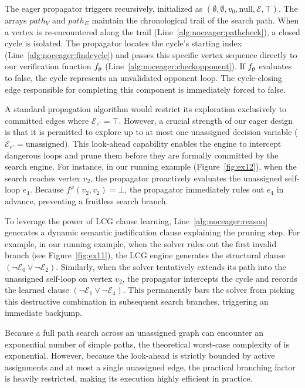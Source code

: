 \documentclass[a4paper,fleqn]{cas-sc}
\begin{document}
The eager propagator triggers recursively, initialized as \noceager$(\emptyset, \emptyset, v_0, \text{null}, \mathcal{E}, \top)$. The arrays $path_V$ and $path_E$ maintain the chronological trail of the search path. 
%
When a vertex is re-encountered along the trail (Line~\ref{alg:noceager:pathcheck}), a closed cycle is isolated. The propagator locates the cycle's starting index (Line~\ref{alg:noceager:findcycle}) and passes this specific vertex sequence directly to our verification function $f_{\mathsf{p}}$ (Line~\ref{alg:noceager:checkopponent}). If $f_{\mathsf{p}}$ evaluates to false, the cycle represents an unvalidated opponent loop. The cycle-closing edge responsible for completing this component is immediately forced to false.

A standard propagation algorithm would restrict its exploration exclusively to committed edges where $\mathcal{E}_{e'} = \top$. However, a crucial strength of our eager design is that it is permitted to explore up to at most one unassigned decision variable ($\mathcal{E}_{e'} = \text{unassigned}$). This look-ahead capability enables the engine to intercept dangerous loops and prune them before they are formally committed by the search engine. For instance, in our running example (Figure~\ref{fig:ex12}), when the search reaches vertex $v_2$, the propagator proactively evaluates the unassigned self-loop $e_4$. Because $f^{\mathcal{\varphi}}(v_2, v_2) = \bot$, the propagator immediately rules out $e_4$ in advance, preventing a fruitless search branch.

To leverage the power of LCG clause learning, Line~\ref{alg:noceager:reason} generates a dynamic semantic justification clause explaining the pruning step. For example, in our running example, when the solver rules out the first invalid branch (see Figure~\ref{fig:ex11}), the LCG engine generates the structural clause $(\neg \mathcal{E}_0 \lor \neg \mathcal{E}_2)$. Similarly, when the solver tentatively extends its path into the unassigned self-loop on vertex $v_2$, the propagator intercepts the cycle and records the learned clause $(\neg \mathcal{E}_1 \lor \neg \mathcal{E}_4)$. This permanently bars the solver from picking this destructive combination in subsequent search branches, triggering an immediate backjump.

Because a full path search across an unassigned graph can encounter an exponential number of simple paths, the theoretical worst-case complexity of \noceager is exponential. However, because the look-ahead is strictly bounded by active assignments and at most a single unassigned edge, the practical branching factor is heavily restricted, making its execution highly efficient in practice.
\end{document}
